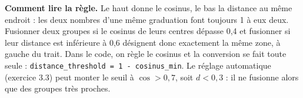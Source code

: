 \begin{lire}
\textbf{Comment lire la règle.} Le haut donne le cosinus, le bas la distance au même endroit : les deux
nombres d'une même graduation font toujours 1 à eux deux. \og Fusionner deux groupes si le cosinus de leurs
centres dépasse 0,4 \fg{} et \og fusionner si leur distance est inférieure à 0,6 \fg{} désignent donc
exactement la même zone, à gauche du trait. Dans le code, on règle le cosinus et la conversion se fait toute
seule : \texttt{distance\_threshold = 1 - cosinus\_min}. Le réglage automatique (exercice 3.3) peut monter le
seuil à $\cos > 0{,}7$, soit $d < 0{,}3$ : il ne fusionne alors que des groupes très proches.
\end{lire}

